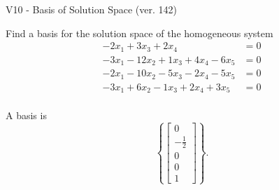 \begin{exercise}
  \begin{exerciseTitle}V10 - Basis of Solution Space (ver. 142)\end{exerciseTitle}
  \begin{exerciseStatement}
    Find a basis for the solution space of the homogeneous system 
\begin{align*}
 -2 x_ 1 + 3 x_ 3 + 2 x_ 4 &= 0  \\ 
  -3 x_ 1 -12 x_ 2 + 1 x_ 3 + 4 x_ 4 -6 x_ 5 &= 0  \\ 
  -2 x_ 1 -10 x_ 2 -5 x_ 3 -2 x_ 4 -5 x_ 5 &= 0  \\ 
  -3 x_ 1 + 6 x_ 2 -1 x_ 3 + 2 x_ 4 + 3 x_ 5 &= 0  \\ 
 \end{align*}


 
  \end{exerciseStatement}

  \begin{exerciseAnswer}
   A basis is   
\[\left\{\left[\begin{array}{c}
0 \\
-\frac{1}{2} \\
0 \\
0 \\
1
\end{array}\right]\right\}.\]

  


  \end{exerciseAnswer}
\end{exercise}